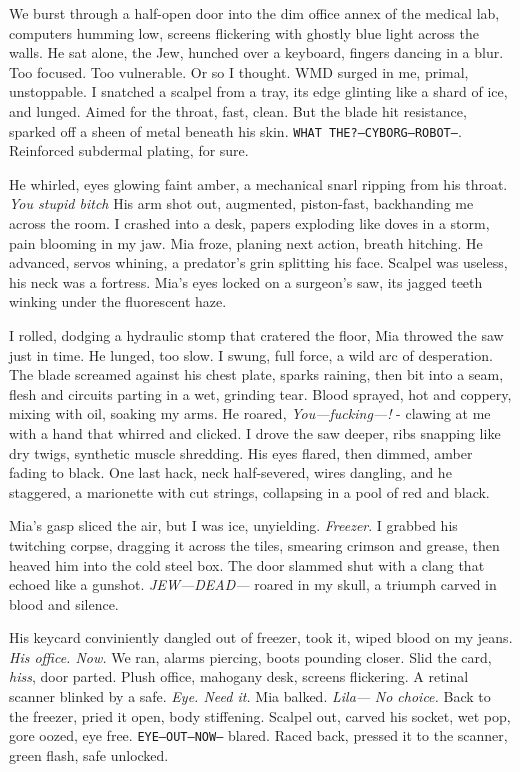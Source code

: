 \documentclass[12pt,oneside]{book} %
\newcommand{\note}[1]{\texttt{#1}}
\begin{document}
We burst through a half-open door into the dim office annex of the medical lab, computers humming low, screens flickering with ghostly blue light across the walls. He sat alone, the Jew, hunched over a keyboard, fingers dancing in a blur. Too focused. Too vulnerable. Or so I thought. WMD surged in me, primal, unstoppable. I snatched a scalpel from a tray, its edge glinting like a shard of ice, and lunged. Aimed for the throat, fast, clean. But the blade hit resistance, sparked off a sheen of metal beneath his skin. \note{WHAT THE?—CYBORG—ROBOT—}. Reinforced subdermal plating, for sure.

He whirled, eyes glowing faint amber, a mechanical snarl ripping from his throat. \textit{You stupid bitch} His arm shot out, augmented, piston-fast, backhanding me across the room. I crashed into a desk, papers exploding like doves in a storm, pain blooming in my jaw. Mia froze, planing next action, breath hitching. He advanced, servos whining, a predator’s grin splitting his face. Scalpel was useless, his neck was a fortress. Mia's eyes locked on a surgeon’s saw, its jagged teeth winking under the fluorescent haze. 

I rolled, dodging a hydraulic stomp that cratered the floor, Mia throwed the saw just in time. He lunged, too slow. I swung, full force, a wild arc of desperation. The blade screamed against his chest plate, sparks raining, then bit into a seam, flesh and circuits parting in a wet, grinding tear. Blood sprayed, hot and coppery, mixing with oil, soaking my arms. He roared, \textit{You—fucking—!} - clawing at me with a hand that whirred and clicked. I drove the saw deeper, ribs snapping like dry twigs, synthetic muscle shredding. His eyes flared, then dimmed, amber fading to black. One last hack, neck half-severed, wires dangling, and he staggered, a marionette with cut strings, collapsing in a pool of red and black.

Mia’s gasp sliced the air, but I was ice, unyielding. \textit{Freezer}. I grabbed his twitching corpse, dragging it across the tiles, smearing crimson and grease, then heaved him into the cold steel box. The door slammed shut with a clang that echoed like a gunshot. \textit{JEW—DEAD—} roared in my skull, a triumph carved in blood and silence.

His keycard conviniently dangled out of freezer, took it, wiped blood on my jeans. \textit{His office. Now.} We ran, alarms piercing, boots pounding closer. Slid the card, \textit{hiss}, door parted. Plush office, mahogany desk, screens flickering. A retinal scanner blinked by a safe. 
\textit{Eye. Need it.} Mia balked. \textit{Lila—} 
\textit{No choice.} Back to the freezer, pried it open, body stiffening. Scalpel out, carved his socket, wet pop, gore oozed, eye free. \note{EYE—OUT—NOW—} blared. Raced back, pressed it to the scanner, green flash, safe unlocked.
\end{document}
